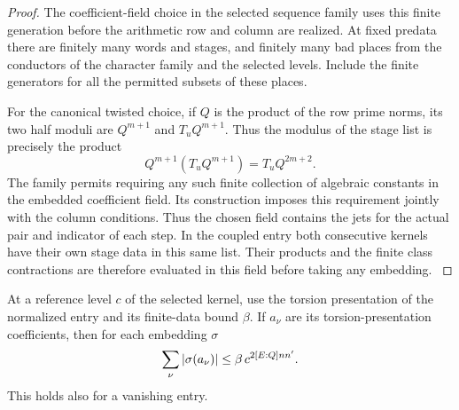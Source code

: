 \begin{proof}
The coefficient-field choice in the selected sequence family
uses this finite generation before the arithmetic row
and column are realized. At fixed predata there are
finitely many words and stages, and finitely many
bad places from the conductors of the character family
and the selected levels. Include the finite generators
for all the permitted subsets of these places.

For the
canonical twisted choice, if \(Q\) is the product of the
row prime norms, its two half moduli are
\(Q^{m+1}\) and \(T_uQ^{m+1}\). Thus the modulus of the stage list is precisely the product
\[
 Q^{m+1}(T_uQ^{m+1})=T_u Q^{2m+2}.
\] The family permits
requiring any such finite collection of algebraic
constants in the embedded coefficient field. Its
construction imposes this requirement jointly with the
column conditions. Thus the chosen field contains the
jets for the actual pair and indicator of each step.
In the coupled entry both consecutive kernels have
their own stage data in this same list. Their products
and the finite class contractions are therefore evaluated
in this field before taking any embedding.
\label{cor:selected-kernel-jets-2}
\end{proof}

\begin{proposition}\label{prop:torsion-jet-mass}
At a reference level \(c\) of the selected kernel, use the
torsion presentation of the normalized entry and its finite-data
bound \(\beta\). If \(a_\nu\) are its torsion-presentation coefficients, then for each embedding \(\sigma\)
\[
 \sum_\nu|\sigma(a_\nu)|\le\beta\,c^{2[E:Q]nn'}.
\]
 This holds also
for a vanishing entry.
\end{proposition}

